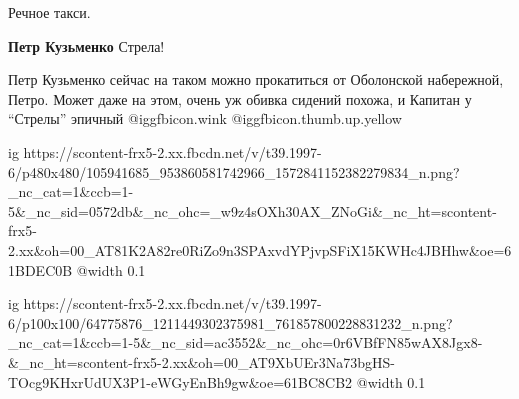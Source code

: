  
 
 
 
 

Речное такси.

\textbf{Петр Кузьменко} Стрела!


Петр Кузьменко сейчас на таком можно прокатиться от Оболонской набережной,
Петро. Может даже на этом, очень уж обивка сидений похожа, и Капитан у \enquote{Стрелы}
эпичный  @igg{fbicon.wink}  @igg{fbicon.thumb.up.yellow} 


\ifcmt
  ig https://scontent-frx5-2.xx.fbcdn.net/v/t39.1997-6/p480x480/105941685_953860581742966_1572841152382279834_n.png?_nc_cat=1&ccb=1-5&_nc_sid=0572db&_nc_ohc=_w9z4sOXh30AX_ZNoGi&_nc_ht=scontent-frx5-2.xx&oh=00_AT81K2A82re0RiZo9n3SPAxvdYPjvpSFiX15KWHc4JBHhw&oe=61BDEC0B
  @width 0.1
\fi


\ifcmt
  ig https://scontent-frx5-2.xx.fbcdn.net/v/t39.1997-6/p100x100/64775876_1211449302375981_761857800228831232_n.png?_nc_cat=1&ccb=1-5&_nc_sid=ac3552&_nc_ohc=0r6VBfFN85wAX8Jgx8-&_nc_ht=scontent-frx5-2.xx&oh=00_AT9XbUEr3Na73bgHS-TOcg9KHxrUdUX3P1-eWGyEnBh9gw&oe=61BC8CB2
  @width 0.1
\fi
